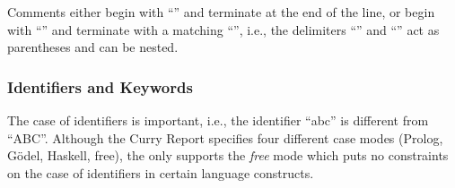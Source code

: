 Comments either begin with \enquote{\term{-{}-}} and terminate at the end
of the line,
or begin with \enquote{\term{\{-}} and terminate with a matching
\enquote{\term{-\}}}, i.e., the delimiters \enquote{\term{\{-}} and
\enquote{\term{-\}}} act as parentheses and can be nested.

\subsubsection{Identifiers and Keywords}

The case of identifiers is important, i.e., the identifier \enquote{abc}
is different from \enquote{ABC}.
Although the Curry Report specifies four different case modes
(Prolog, G\"odel, Haskell, free),
the \CYS only supports the \emph{free} mode
which puts no constraints on the case of identifiers in certain
language constructs.

\begin{grammar}
 \\

\\

\\
\\
\\
\\
\\
\\
\\

\\
\\
\\
\\
\end{grammar}

